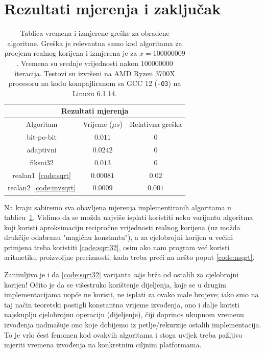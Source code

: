 \documentclass[12pt]{scrartcl}
\begin{document}
\section{Rezultati mjerenja i zaključak}
\begin{table}[t]
    \center
    \caption{Tablica vremena i izmjerene greške za obrađene algoritme. Greška je relevantna samo kod algoritama za procjenu realnog korijena i izmjerena
    je za $x=100000009$. Vremena su srednje vrijednosti nakon $100000000$ iteracija. Testovi su izvršeni na AMD Ryzen 3700X procesoru na kodu kompajliranom
    sa GCC 12 (\texttt{-O3}) na Linuxu 6.1.14.}\label{tbl}
    \begin{tabular}{|c|c|c|}
    \hline
    \multicolumn{3}{|c|}{\textbf{Rezultati mjerenja}}\\ \hline
    Algoritam & Vrijeme ($\mu s$) & Relativna greška \\ \hline\hline
    bit-po-bit & $0.011$ & $0$ \\ \hline
    adaptivni & $0.0242$ & $0$ \\ \hline
    fiksni32 & $0.013$ & $0$ \\ \hline
    realan1~\eqref{code:sqrt} & $0.00081$ & $0.02$ \\ \hline
    realan2~\eqref{code:invsqrt} & $0.0009$ & $0.001$ \\ \hline
    \end{tabular}
\end{table}
Na kraju sabiremo sva obavljena mjerenja implementiranih algoritama u tablicu~\ref{tbl}. Vidimo da se možda najviše isplati koristiti neku varijantu
algoritma koji koristi aproksimaciju recipročne vrijednosti realnog korijena (uz možda drukčije odabranu "magičnu konstantu"), a za cjelobrojni
korijen u većini primjena treba koristiti \autoref{code:sqrt32}, osim ako nam program već koristi aritmetiku proizvoljne preciznosti, kada
treba preći na nešto poput \autoref{code:nsqrt}.

Zanimljivo je i da \autoref{code:sqrt32} varijanta \emph{nije} brža od ostalih za cjelobrojni korijen! Očito je da se višestruko korištenje dijeljenja, koje se 
u drugim implementacijama uopće ne koristi, ne isplati za ovako male brojeve; iako smo na taj način teoretski postigli konstantno vrijeme izvođenja,
ono i dalje koristi najskuplju cjelobrojnu operaciju (dijeljenje), čiji doprinos ukupnom vremenu izvođenja nadmašuje ono koje dobijemo iz petlje/rekurzije
ostalih implementacija. To je vrlo čest fenomen kod ovakvih algoritama i stoga uvijek treba pažljivo mjeriti vremena izvođenja na konkretnim ciljnim
platformama.
\end{document}

